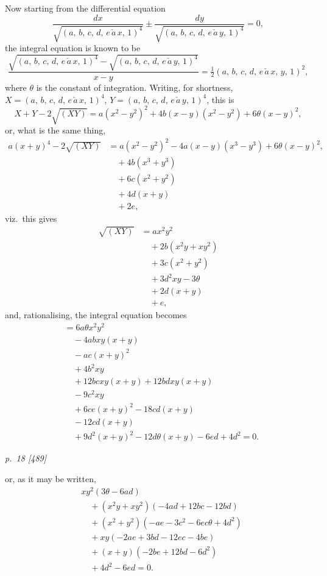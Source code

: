 \documentclass[11pt,a4paper]{book}
\begin{document}
Now starting from the differential equation
\[
\frac{dx}{\sqrt{(a,\,b,\,c,\,d,\,e\,\check{a}\,x,\,1)^4}} \pm \frac{dy}{\sqrt{(a,\,b,\,c,\,d,\,e\,\check{a}\,y,\,1)^4}} = 0,
\]
the integral equation is known to be
\[
\frac{\sqrt{(a,\,b,\,c,\,d,\,e\,\check{a}\,x,\,1)^4} - \sqrt{(a,\,b,\,c,\,d,\,e\,\check{a}\,y,\,1)^4}}{x-y} = \tfrac{1}{2}(a,\,b,\,c,\,d,\,e\,\check{a}\,x,\,y,\,1)^2,
\]
where $\theta$ is the constant of integration. Writing, for shortness, $X=(a,\,b,\,c,\,d,\,e\,\check{a}\,x,\,1)^4$,
$Y=(a,\,b,\,c,\,d,\,e\,\check{a}\,y,\,1)^4$, this is
\[
X+Y-2\sqrt{(XY)}=a(x^2-y^2)^2+4b(x-y)(x^2-y^2)+6\theta(x-y)^2,
\]
or, what is the same thing,
\begin{align*}
a(x+y)^4 - 2\sqrt{(XY)} &= a(x^2-y^2)^2 - 4a(x-y)(x^3-y^3) + 6\theta(x-y)^2,\\
&\quad + 4b(x^3+y^3)\\
&\quad + 6c(x^2+y^2)\\
&\quad + 4d(x+y)\\
&\quad + 2e,
\end{align*}
viz.\ this gives
\begin{align*}
\sqrt{(XY)} &= ax^2y^2 \\
&\quad + 2b(x^2y+xy^2)\\
&\quad + 3c(x^2+y^2)\\
&\quad + 3d^2xy - 3\theta\\
&\quad + 2d(x+y)\\
&\quad + e,
\end{align*}
and, rationalising, the integral equation becomes
\begin{align*}
&= 6a\theta x^2y^2\\
&\quad - 4ab xy(x+y)\\
&\quad - ac(x+y)^2\\
&\quad + 4b^2 xy\\
&\quad + 12bc xy(x+y) + 12bd xy(x+y)\\
&\quad - 9c^2 xy\\
&\quad + 6ce(x+y)^2 - 18cd(x+y)\\
&\quad - 12cd(x+y)\\
&\quad + 9d^2(x+y)^2 - 12d\theta(x+y) - 6ed + 4d^2 = 0.
\end{align*}

\clearpage

\bigskip
\textit{p.~18 [489]}
\smallskip

or, as it may be written,
\begin{align*}
&xy^2(3\theta - 6ad)\\
&\quad + (x^2y+xy^2)(-4ad + 12bc - 12bd)\\
&\quad + (x^2+y^2)(-ae - 3c^2 - 6ec\theta + 4d^2)\\
&\quad + xy(-2ae+3bd - 12ec - 4be)\\
&\quad + (x+y)(-2be+ 12bd - 6d^2)\\
&\quad + 4d^2 - 6ed = 0.
\end{align*}
\end{document}
